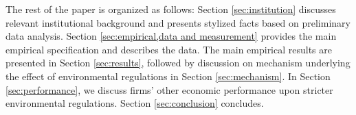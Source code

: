 \documentclass[12pt,english]{article}
\begin{document}


The rest of the paper is organized as follows: Section \ref{sec:institution} discusses relevant institutional background and presents stylized facts based on preliminary data analysis. Section \ref{sec:empirical,data and measurement} provides the main empirical specification and describes the data. The main empirical results are presented in Section \ref{sec:results}, followed by discussion on mechanism underlying the effect of environmental regulations in Section \ref{sec:mechanism}. In Section \ref{sec:performance}, we discuss firms' other economic performance upon stricter environmental regulations. Section \ref{sec:conclusion} concludes.
\end{document}
